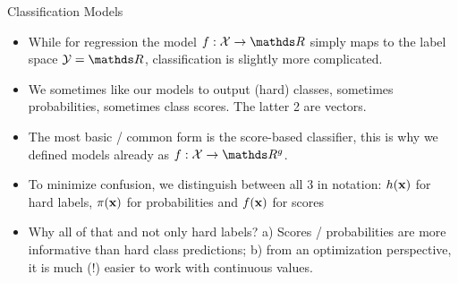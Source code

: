 \documentclass[11pt,compress,t,notes=noshow, xcolor=table]{beamer}
\begin{document}
\begin{vbframe}{Classification Models} 

\begin{itemize}

\item While for regression the model $f: \Xspace \to \R$ simply maps to the label space $\Yspace=\R$, classification is slightly more complicated.
\item We sometimes like our models to output (hard) classes, 
sometimes probabilities, sometimes class scores. The latter 2 are vectors. 
\item The most basic / common form is the score-based classifier, this is why we defined models already as $f: \Xspace \to \R^g$.
\item To minimize confusion, we distinguish between all 3 in notation: $h(\mathbf{x})$ for hard labels, $\pi(\mathbf{x})$ for probabilities and $f(\mathbf{x})$ for scores

\item Why all of that and not only hard labels? a) Scores / probabilities are more informative than hard class predictions; b) from an optimization perspective, it is much (!) easier to work with continuous values.

\end{itemize}

\end{vbframe}
\end{document}
